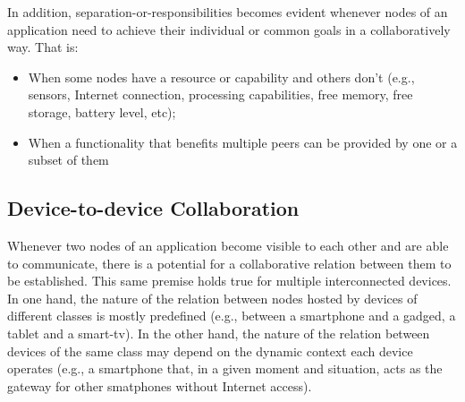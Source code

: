 
In addition, separation-or-responsibilities becomes evident whenever nodes of an application need to achieve their individual or common goals in a collaboratively way. That is:

\begin{itemize}
	
	\item When some nodes have a resource or capability and others don't (e.g., sensors, Internet connection, processing capabilities, free memory, free storage, battery level, etc);
	
	\item When a functionality that benefits multiple peers can be provided by one or a subset of them
	
\end{itemize}

\subsection{Device-to-device Collaboration}

Whenever two nodes of an application become visible to each other and are able to communicate, there is a potential for a collaborative relation between them to be established. 
This same premise holds true for multiple interconnected devices. 
In one hand, the nature of the relation between nodes hosted by devices of different classes is mostly predefined (e.g., between a smartphone and a gadged, a tablet and a smart-tv). In the other hand, the nature of the relation between devices of the same class may depend on the dynamic context each device operates (e.g., a smartphone that, in a given moment and situation, acts as the gateway for other smatphones without Internet access). 



